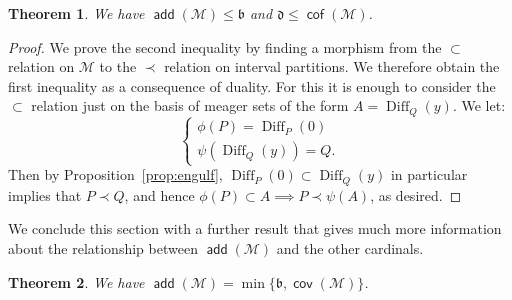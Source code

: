 \documentclass[11pt,oneside]{amsbook}
\newcommand{\Meager}{\mathcal M}
\DeclareMathOperator{\add}{\mathsf{add}}
\DeclareMathOperator{\cov}{\mathsf{cov}}
\DeclareMathOperator{\cof}{\mathsf{cof}}
\DeclareMathOperator{\Diff}{Diff}
\theoremstyle{definition}
\theoremstyle{plain}
\newtheorem{theorem}{Theorem}[section]
\theoremstyle{definition}
\theoremstyle{remark}
\numberwithin{equation}{section}
\numberwithin{figure}{section}
\begin{document}
\begin{theorem}
  \label{thm:addm-b}
  We have $\add(\Meager)\leq\mathfrak b$ and $\mathfrak d\leq\cof(\Meager)$.
\end{theorem}

\begin{proof}
  We prove the second inequality by finding a morphism from the $\subset$ relation on $\Meager$ to the $\prec$ relation on interval partitions. We therefore obtain the first inequality as a consequence of duality. For this it is enough to consider the $\subset$ relation just on the basis of meager sets of the form $A=\Diff_Q(y)$. We let:
  \[\begin{cases}\phi(P)=\Diff_P(0)\\\psi(\Diff_Q(y))=Q\text{.}\end{cases}
  \]
  Then by Proposition~\ref{prop:engulf}, $\Diff_P(0)\subset\Diff_Q(y)$ in particular implies that $P\prec Q$, and hence $\phi(P)\subset A\implies P\prec\psi(A)$, as desired.
\end{proof}

We conclude this section with a further result that gives much more information about the relationship between $\add(\Meager)$ and the other cardinals.

\begin{theorem}
  We have $\add(\Meager)=\min\{\mathfrak b,\cov(\Meager)\}$.
\end{theorem}
\end{document}
